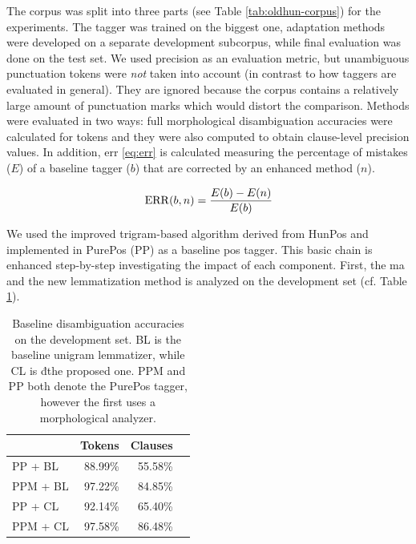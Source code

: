 The corpus was split into three parts (see Table \ref{tab:oldhun-corpus}) for the experiments. 
The tagger was trained on the biggest one, adaptation methods were developed on a separate development subcorpus, while final evaluation was done on the test set.
We used precision as an evaluation metric, but unambiguous punctuation tokens were \emph{not} taken into account (in contrast to how taggers are evaluated in general). 
They are ignored because the corpus contains a relatively large amount of punctuation marks which would distort the comparison.
Methods were evaluated in two ways: full morphological disambiguation accuracies were calculated for tokens and they were also computed to obtain clause-level precision values. 
In addition, \gls{err} \eqref{eq:err} is calculated measuring the percentage of mistakes ($E$) of a baseline tagger ($b$) that are corrected by an enhanced method ($n$). 

\begin{equation}\label{eq:err}
\operatorname{ERR}(b,n) = \frac{E(b)-E(n)}{E(b)}
\end{equation}

We used the improved trigram-based algorithm derived from HunPos and implemented in PurePos (PP) as a baseline \gls{pos} tagger. 
This basic chain is enhanced step-by-step investigating the impact of each component.
First, the \acrshort{ma} and the new lemmatization method is analyzed on the development set (cf. Table \ref{tab:oldhun-baselines}). 

\begin{table}[H]
\centering
\caption{Baseline disambiguation accuracies on the development set. BL is the baseline unigram lemmatizer, while CL is đthe proposed one. PPM and PP both denote the PurePos tagger, however the first uses a morphological analyzer.}\label{tab:oldhun-baselines}
\begin{tabular}{l r r r}
\hline
 & Tokens & Clauses \\
\hline
PP + BL  & 88.99\% & 55.58\% \\
PPM + BL  & 97.22\% & 84.85\% \\
PP + CL & 92.14\% & 65.40\% \\
PPM + CL & 97.58\% & 86.48\% \\
\hline
\end{tabular}
\end{table}


